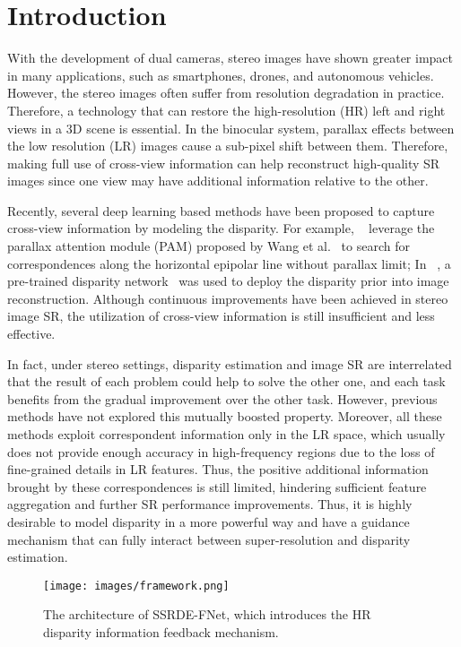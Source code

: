 \documentclass[sigconf]{acmart}
\begin{document}
\section{Introduction}
With the development of dual cameras, stereo images have shown greater impact in many applications, such as smartphones, drones, and autonomous vehicles. However, the stereo images often suffer from resolution degradation in practice. Therefore, a technology that can restore the high-resolution (HR) left and right views in a 3D scene is essential. In the binocular system, parallax effects between the low resolution (LR) images cause a sub-pixel shift between them. Therefore, making full use of cross-view information can help reconstruct high-quality SR images since one view may have additional information relative to the other.

Recently, several deep learning based methods have been proposed to capture cross-view information by modeling the disparity. For example, ~\cite{Wang2019LearningPA, Wang2020ParallaxAF, Ying2020ASA, Song2020StereoscopicIS, BSSRnet, Wang2020SymmetricPA} leverage the parallax attention module (PAM) proposed by Wang et al.~\cite{Wang2019LearningPA, Wang2020ParallaxAF} to search for correspondences along the horizontal epipolar line without parallax limit; In ~\cite{Yan2020DisparityAwareDA}, a pre-trained disparity network~\cite{Khamis2018StereoNetGH} was used to deploy the disparity prior into image reconstruction. Although continuous improvements have been achieved in stereo image SR, the utilization of cross-view information is still insufficient and less effective.

In fact, under stereo settings, disparity estimation and image SR are interrelated that the result of each problem could help to solve the other one, and each task benefits from the gradual improvement over the other task. However, previous methods have not explored this mutually boosted property. Moreover, all these methods exploit correspondent information only in the LR space, which usually does not provide enough accuracy in high-frequency regions due to the loss of fine-grained details in LR features. Thus, the positive additional information brought by these correspondences is still limited, hindering sufficient feature aggregation and further SR performance improvements. Thus, it is highly desirable to model disparity in a more powerful way and have a guidance mechanism that can fully interact between super-resolution and disparity estimation.

\begin{figure*}[t]
  \centering
  \texttt{[image: images/framework.png]}
  \begin{minipage}[c]{1\textwidth}
  \end{minipage}
  \caption{The architecture of SSRDE-FNet, which introduces the HR disparity information feedback mechanism.}
\label{fig-2}
  \vspace{-12px}
\end{figure*}
\end{document}
